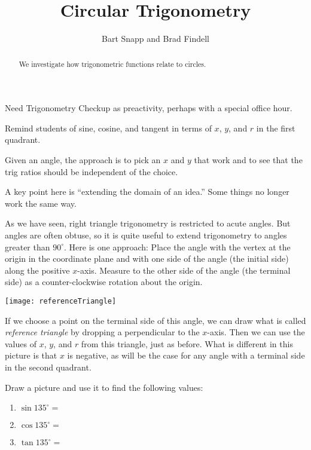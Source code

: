 \documentclass[nooutcomes]{ximera}
\title{Circular Trigonometry}
\author{Bart Snapp and Brad Findell}
\begin{document}
\begin{abstract}
We investigate how trigonometric functions relate to circles.
\end{abstract}
\maketitle

\begin{teachingnote}
Need Trigonometry Checkup as preactivity, perhaps with a special office hour.  

Remind students of sine, cosine, and tangent in terms of $x$, $y$, and $r$ in the first quadrant.  

Given an angle, the approach is to pick an $x$ and $y$ that work and to see that the trig ratios should be independent of the choice.  

A key point here is ``extending the domain of an idea.''  Some things no longer work the same way.
\end{teachingnote}

As we have seen, right triangle trigonometry is restricted to acute angles.  But angles are often obtuse, so it is quite useful to extend trigonometry to angles greater than $90^\circ$.  Here is one approach:  Place the angle with the vertex at the origin in the coordinate plane and with one side of the angle (the initial side) along the positive $x$-axis.  
Measure to the other side of the angle (the terminal side) as a counter-clockwise rotation about the origin.   

\begin{image}
\texttt{[image: referenceTriangle]}
\end{image}

If we choose a point on the terminal side of this angle, we can draw what is called \emph{reference triangle} by dropping a perpendicular to the $x$-axis.  Then we can use the values of $x$, $y$, and $r$ from this triangle, just as before.  What is different in this picture is that $x$ is negative, as will be the case for any angle with a terminal side in the second quadrant.  


\begin{problem}
Draw a picture and use it to find the following values: 
\begin{enumerate}
\item $\sin 135^\circ = $
\item $\cos 135^\circ =$
\item $\tan 135^\circ =$
\end{enumerate}
\vfill
\end{problem}
\end{document}
